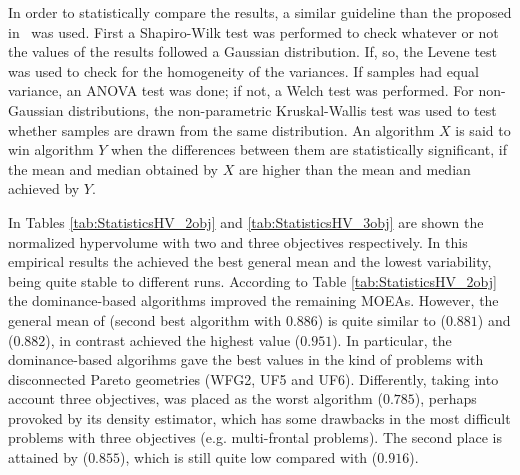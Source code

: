 %
In order to statistically compare the \HV{} results, a similar guideline than the proposed in~\cite{Joel:StatisticalTest} was used. 
%
First a Shapiro-Wilk test was performed to check whatever or not the values of the results followed a Gaussian distribution. 
%
If, so, the Levene test was used to check for the homogeneity of the variances. 
%
If samples had equal variance, an ANOVA test was done; if not, a Welch test was performed. 
%
For non-Gaussian distributions, the non-parametric Kruskal-Wallis test was used to test whether samples are drawn from the same distribution. 
%
An algorithm $X$ is said to win algorithm $Y$ when the differences between them are statistically significant, if the mean and median obtained by $X$ are higher than the mean and median achieved by $Y$.
%

In Tables \ref{tab:StatisticsHV_2obj} and \ref{tab:StatisticsHV_3obj} are shown the normalized hypervolume with two and three objectives respectively.
%
In this empirical results the \VSDMOEA{} achieved the best general mean and the lowest variability, being quite stable to different runs.
%
According to Table \ref{tab:StatisticsHV_2obj} the dominance-based algorithms improved the remaining MOEAs.
%
However, the general mean of \NSGAII{} (second best algorithm with $0.886$) is quite similar to \MOEAD{} ($0.881$) and \RMOEA{} ($0.882$), in contrast \VSDMOEA{} achieved the highest \HV{} value ($0.951$).
%
In particular, the dominance-based algorihms gave the best values in the kind of problems with disconnected Pareto geometries (WFG2, UF5 and UF6).
%
Differently, taking into account three objectives, \NSGAII{} was placed as the worst algorithm ($0.785$), perhaps provoked by its density estimator, which has some drawbacks in the most difficult problems with three objectives (e.g. multi-frontal problems).
%
The second place is attained by \RMOEA{} ($0.855$), which is still quite low compared with \VSDMOEA{} ($0.916$).
%



